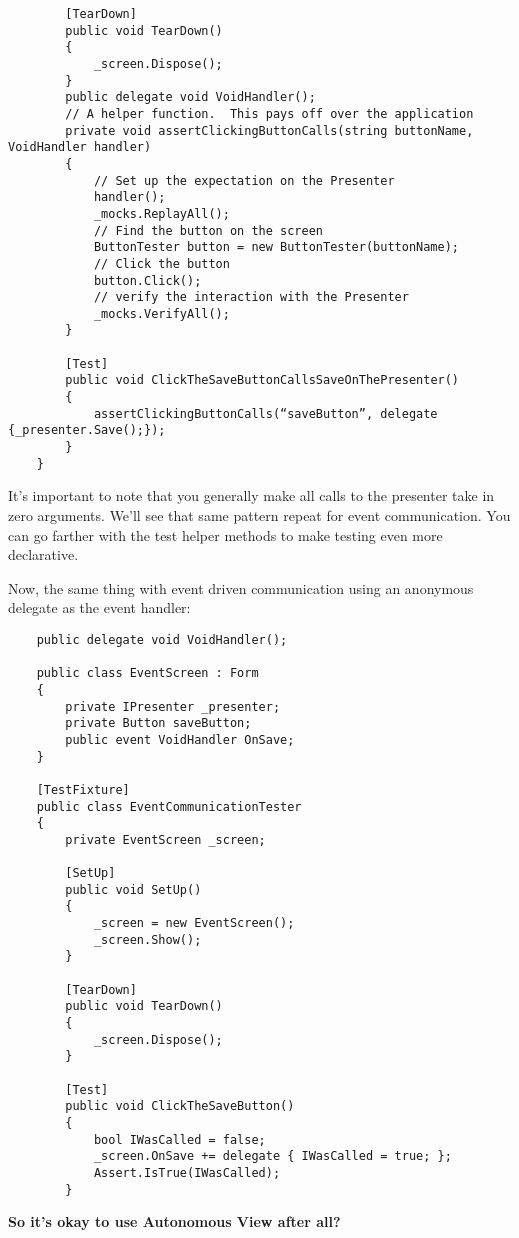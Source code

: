 \documentclass{article}
\begin{document}
{\begin{lstlisting}
        [TearDown]
        public void TearDown()
        {
            _screen.Dispose();
        }
        public delegate void VoidHandler();
        // A helper function.  This pays off over the application
        private void assertClickingButtonCalls(string buttonName, VoidHandler handler)
        {
            // Set up the expectation on the Presenter
            handler();
            _mocks.ReplayAll();
            // Find the button on the screen
            ButtonTester button = new ButtonTester(buttonName);
            // Click the button
            button.Click();
            // verify the interaction with the Presenter
            _mocks.VerifyAll();
        } 

        [Test]
        public void ClickTheSaveButtonCallsSaveOnThePresenter()
        {
            assertClickingButtonCalls(“saveButton”, delegate {_presenter.Save();});
        }
    }
\end{lstlisting}	

It's important to note that you generally make all calls to the presenter take in zero arguments.  We'll see that same pattern repeat for event communication.  You can go farther with the test helper methods to make testing even more declarative. 

Now, the same thing with event driven communication using an anonymous delegate as the event handler:
\newpage
\begin{lstlisting}
    public delegate void VoidHandler();

    public class EventScreen : Form
    {
        private IPresenter _presenter;
        private Button saveButton;
        public event VoidHandler OnSave;
    }

    [TestFixture]
    public class EventCommunicationTester
    {
        private EventScreen _screen; 

        [SetUp]
        public void SetUp()
        {
            _screen = new EventScreen();
            _screen.Show();
        } 

        [TearDown]
        public void TearDown()
        {
            _screen.Dispose();
        } 

        [Test]
        public void ClickTheSaveButton()
        {
            bool IWasCalled = false;
            _screen.OnSave += delegate { IWasCalled = true; };
            Assert.IsTrue(IWasCalled);
        }
\end{lstlisting}		
		
\Large {\textbf{So it's okay to use Autonomous View after all?}}

}
\end{document}
